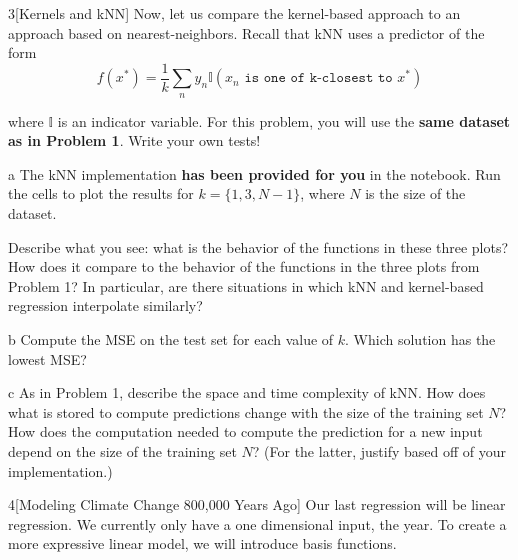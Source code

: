 \documentclass[expanded]{lkx_pset}
\begin{document}
\begin{problem}{3}[Kernels and kNN]
  Now, let us compare the kernel-based approach to an approach based on
  nearest-neighbors.  Recall that kNN uses a predictor of the form
  \begin{equation*}
    f(x^*) = \frac{1}{k} \sum_n y_n \mathbb{I}(x_n \texttt{ is one of k-closest to } x^*)
  \end{equation*}

  \noindent where $\mathbb{I}$ is an indicator variable. For this problem, you will use the \textbf{same dataset as in Problem 1}. Write your own tests!
\end{problem}

\begin{parts}
  \begin{part}{a}
    The kNN implementation \textbf{has been provided for you} in the notebook. Run the cells to plot the results for $k=\{1, 3, N-1\}$, where $N$ is the size of the dataset.

    Describe what you see: what is the behavior of the functions in
    these three plots?  How does it compare to the behavior of the
    functions in the three plots from Problem 1? In particular, are
    there situations in which kNN and kernel-based regression
    interpolate similarly?
  \end{part}

  \begin{part}{b}
    Compute the MSE on the test set for each value of $k$.  Which solution has the lowest MSE?  
  \end{part}

  \begin{part}{c}
    As in Problem 1, describe the space and time complexity of kNN.  How does what is stored to compute predictions change with the size of the training set $N$?  How does the computation needed to compute the prediction for a new input depend on the size of the training set $N$? (For the latter, justify based off of your implementation.)
  \end{part}
\end{parts}

\begin{problem}{4}[Modeling Climate Change 800,000 Years Ago]
Our last regression will be linear regression.  We currently only have
a one dimensional input, the year.  To create a more expressive linear
model, we will introduce basis functions.
\end{problem}
\end{document}
